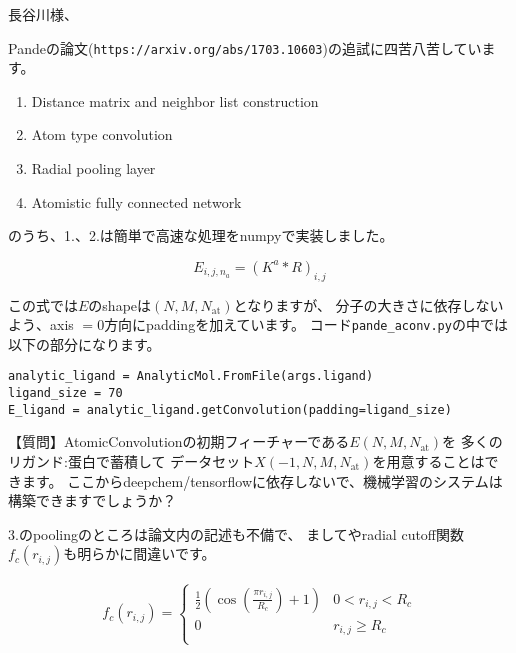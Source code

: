 \documentclass[12pt,a4paer]{jarticle}
\begin{document}
\thispagestyle{empty}

長谷川様、

\vspace{1cm}

Pandeの論文(\texttt{https://arxiv.org/abs/1703.10603})の追試に四苦八苦しています。

\begin{enumerate}
  \item Distance matrix and neighbor list construction
  \vspace{-3mm}
  \item Atom type convolution
  \vspace{-3mm}
  \item Radial pooling layer
  \vspace{-3mm}
  \item Atomistic fully connected network
\end{enumerate}

のうち、1.、2.は簡単で高速な処理をnumpyで実装しました。

\[
E_{i,j,n_a} = (K^a*R)_{i,j}
\]

この式では$E$のshapeは$(N, M, N_{\mathrm{at}})$となりますが、
分子の大きさに依存しないよう、axis $=0$方向にpaddingを加えています。
コード\texttt{pande\_aconv.py}の中では以下の部分になります。

\begin{verbatim}
analytic_ligand = AnalyticMol.FromFile(args.ligand)
ligand_size = 70
E_ligand = analytic_ligand.getConvolution(padding=ligand_size)
\end{verbatim}

【質問】AtomicConvolutionの初期フィーチャーである$E(N, M, N_{\textrm{at}})$を
多くのリガンド:蛋白で蓄積して
データセット$X(-1, N, M, N_{\textrm{at}})$を用意することはできます。
ここからdeepchem/tensorflowに依存しないで、機械学習のシステムは構築できますでしょうか？
\vspace{.5cm}

3.のpoolingのところは論文内の記述も不備で、
ましてやradial cutoff関数$f_c(r_{i,j})$も明らかに間違いです。

\begin{eqnarray}
  f_c(r_{i,j}) = \left\{
      \begin{array}{ll}
      \frac12\left(\cos\left(\frac{\pi r_{i,j}}{R_c}\right) + 1\right) & 0 < r_{i,j} < R_c \\
      0 & r_{i,j} \geq R_c \\
      \end{array} \right.
\end{eqnarray}
\end{document}

